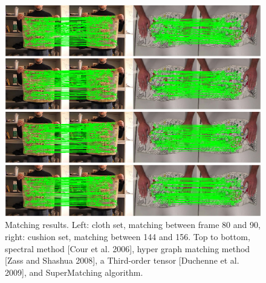 \begin{figure}[tb]
\centering
  \includegraphics[width=1.00\linewidth]{figures/2DDeformable.jpg}
  \caption{Matching results. Left: cloth set, matching between frame 80 and 90, right: cushion set, matching between 144 and 156.
  Top to bottom, spectral method [Cour et al. 2006], hyper graph matching method [Zass and Shashua 2008], a Third-order tensor [Duchenne et al. 2009], and SuperMatching algorithm.}
\label{fig:2DDeformable}
\end{figure}

